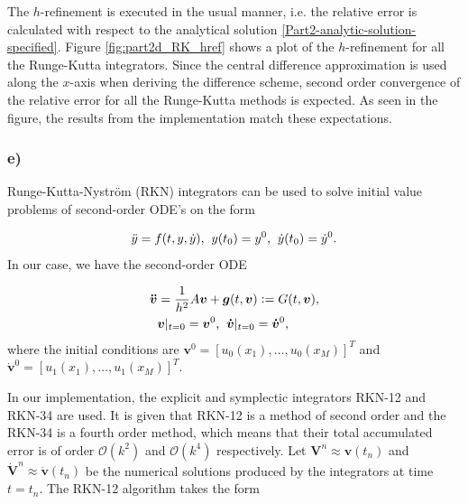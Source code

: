 The $h$-refinement is executed in the usual manner, i.e. the relative error is calculated with respect to the analytical solution \eqref{Part2-analytic-solution-specified}. Figure \ref{fig:part2d_RK_href} shows a plot of the $h$-refinement for all the Runge-Kutta integrators. Since the central difference approximation is used along the $x$-axis when deriving the difference scheme, second order convergence of the relative error for all the Runge-Kutta methods is expected. As seen in the figure, the results from the implementation match these expectations.  

\subsubsection*{e)}
Runge-Kutta-Nyström (RKN) integrators can be used to solve initial value problems of second-order ODE's on the form

\begin{equation*}
    \ddot{y} = f(t,y,\dot{y}) \text{,} \hspace{2mm} y(t_0) = y^0 \text{,} \hspace{2mm} \dot{y}(t_0) = \dot{y}^0. 
\end{equation*}
In our case, we have the second-order ODE

\begin{equation*}
\begin{split}
    \boldsymbol{\ddot{v}} &= \frac{1}{h^2}A\boldsymbol{v} + \boldsymbol{g}(t,\boldsymbol{v}) := G(t,\boldsymbol{v}),\\ &\boldsymbol{v}|_{t=0}=\boldsymbol{v}^0 \text{,} \hspace{2mm} \boldsymbol{\dot{v}}|_{t=0} = \boldsymbol{\dot{v}}^0,
\end{split}
\end{equation*}
where the initial conditions are $\boldsymbol{v}^0 = [u_0(x_1), \ldots, u_0(x_M)]^T$ and $\boldsymbol{\dot{v}}^0 = [u_1(x_1), \ldots, u_1(x_M)]^T$.

In our implementation, the explicit and symplectic integrators RKN-12 and RKN-34 are used. It is given that RKN-12 is a method of second order and the RKN-34 is a fourth order method, which means that their total accumulated error is of order $\mathcal{O}(k^2)$ and $\mathcal{O}(k^4)$ respectively. Let $\boldsymbol{V}^n \approx \boldsymbol{v}(t_n)$ and $\dot{\boldsymbol{V}}^n \approx \dot{\boldsymbol{v}}(t_n)$ be the numerical solutions produced by the integrators at time $t = t_n$. The RKN-12 algorithm takes the form    


